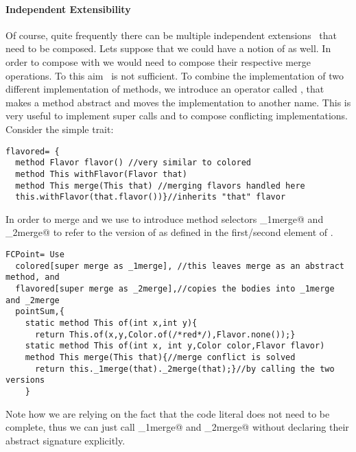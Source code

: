 \paragraph{Independent Extensibility}
  Of course, quite frequently there can be multiple independent
  extensions~\cite{Zenger-Odersky2005} that need to be composed. Lets suppose that 
  we could have a notion of \Q@flavored@ as well.   
  In order to compose \Q@colored@ with \Q@flavored@ we would
  need to compose their respective merge operations. To this aim \use\ is not sufficient. To combine the implementation of two different implementation of methods, we introduce an operator called \Q@super@, that
 makes a method abstract and
moves the implementation to another name. This is very useful to implement super calls
 and to compose conflicting implementations.
\noindent Consider the simple \Q@flavored@ trait:
\saveSpace\saveSpace \begin{lstlisting}
flavored= {
  method Flavor flavor() //very similar to colored
  method This withFlavor(Flavor that)
  method This merge(This that) //merging flavors handled here
  this.withFlavor(that.flavor())}//inherits "that" flavor
\end{lstlisting}  \saveSpace\saveSpace

\noindent In order to merge \Q@colored@ and \Q@flavored@ we use  \Q@super@ to introduce method selectors \Q@_1merge@ and \Q@_2merge@
to refer to the version of \Q@merge@ as defined in the first/second element of \use.

\saveSpace\saveSpace \begin{lstlisting}
FCPoint= Use
  colored[super merge as _1merge], //this leaves merge as an abstract method, and
  flavored[super merge as _2merge],//copies the bodies into _1merge and _2merge
  pointSum,{
    static method This of(int x,int y){
      return This.of(x,y,Color.of(/*red*/),Flavor.none());}
    static method This of(int x, int y,Color color,Flavor flavor)
    method This merge(This that){//merge conflict is solved 
      return this._1merge(that)._2merge(that);}//by calling the two versions
    }
\end{lstlisting}  \saveSpace\saveSpace

Note how we are relying on the fact that the code literal
 does not need to be complete, 
thus we can just call \Q@_1merge@ and \Q@_2merge@ without
 declaring their abstract signature explicitly.



